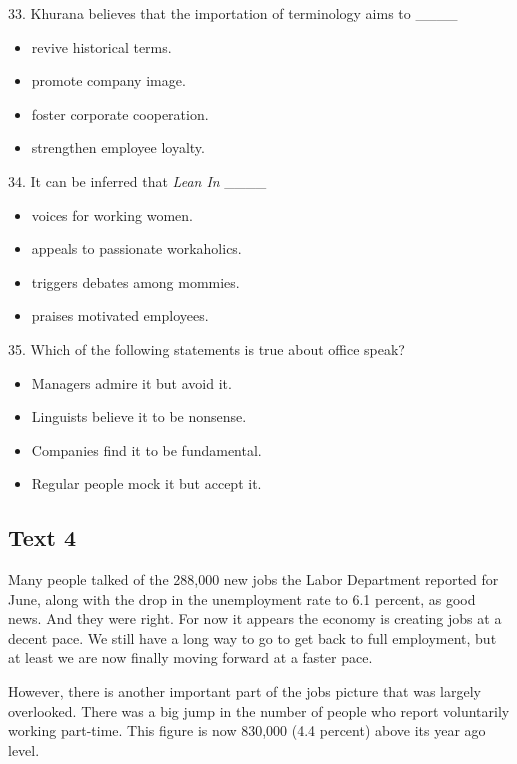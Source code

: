 \documentclass[UTF8,11pt]{ctexart}
\begin{document}
33. Khurana believes that the importation of terminology aims to \_\_\_\_


\begin{itemize}[leftmargin=2em,itemsep=.2em,topsep=.4em]\item[A.] revive historical terms.
\item[B.] promote company image.
\item[C.] foster corporate cooperation.
\item[D.] strengthen employee loyalty.
\end{itemize}

34. It can be inferred that \textit{Lean In} \_\_\_\_


\begin{itemize}[leftmargin=2em,itemsep=.2em,topsep=.4em]\item[A.] voices for working women.
\item[B.] appeals to passionate workaholics.
\item[C.] triggers debates among mommies.
\item[D.] praises motivated employees.
\end{itemize}

35. Which of the following statements is true about office speak?


\begin{itemize}[leftmargin=2em,itemsep=.2em,topsep=.4em]\item[A.] Managers admire it but avoid it.
\item[B.] Linguists believe it to be nonsense.
\item[C.] Companies find it to be fundamental.
\item[D.] Regular people mock it but accept it.
\end{itemize}

\subsection*{\textbf{Text 4}}


Many people talked of the 288,000 new jobs the Labor Department reported for June, along with the drop in the unemployment rate to 6.1 percent, as good news. And they were right. For now it appears the economy is creating jobs at a decent pace. We still have a long way to go to get back to full employment, but at least we are now finally moving forward at a faster pace.


However, there is another important part of the jobs picture that was largely overlooked. There was a big jump in the number of people who report voluntarily working part-time. This figure is now 830,000 (4.4 percent) above its year ago level.
\end{document}

